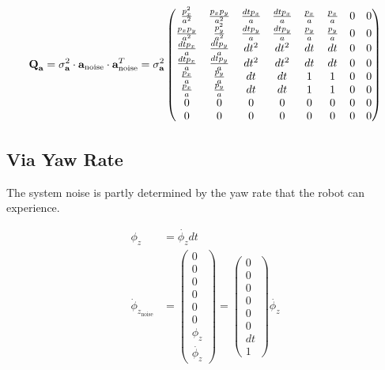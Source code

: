 \documentclass{article}
\begin{document}
\begin{equation}
  \textbf{Q}_{\textbf{a}} = \sigma^2_{\textbf{a}} \cdot \textbf{a}_{\textrm{noise}} \cdot \textbf{a}_{\textrm{noise}}^T \\
  = \sigma^2_{\textbf{a}} \left(\begin{matrix}\frac{p_{x}^{2}}{a^{2}} & \frac{p_{x} p_{y}}{a^{2}} & \frac{dt p_{x}}{a} & \frac{dt p_{x}}{a} & \frac{p_{x}}{a} & \frac{p_{x}}{a} & 0 & 0\\\frac{p_{x} p_{y}}{a^{2}} & \frac{p_{y}^{2}}{a^{2}} & \frac{dt p_{y}}{a} & \frac{dt p_{y}}{a} & \frac{p_{y}}{a} & \frac{p_{y}}{a} & 0 & 0\\\frac{dt p_{x}}{a} & \frac{dt p_{y}}{a} & dt^{2} & dt^{2} & dt & dt & 0 & 0\\\frac{dt p_{x}}{a} & \frac{dt p_{y}}{a} & dt^{2} & dt^{2} & dt & dt & 0 & 0\\\frac{p_{x}}{a} & \frac{p_{y}}{a} & dt & dt & 1 & 1 & 0 & 0\\\frac{p_{x}}{a} & \frac{p_{y}}{a} & dt & dt & 1 & 1 & 0 & 0\\0 & 0 & 0 & 0 & 0 & 0 & 0 & 0\\0 & 0 & 0 & 0 & 0 & 0 & 0 & 0\end{matrix}\right)
\end{equation}


\subsection{Via Yaw Rate}

The system noise is partly determined by the yaw rate that the robot can experience.

\begin{align}
  \phi_z &= \dot{\phi_{z}} dt \\
  \dot{\phi}_{z_\textrm{noise}} &= \left(\begin{matrix}0\\0\\0\\0\\0\\0\\\phi_z\\\dot{\phi_z}\end{matrix}\right) =
  \left(\begin{matrix}0\\0\\0\\0\\0\\0\\dt\\1\end{matrix}\right) \dot{\phi_z}
\end{align}
\end{document}
